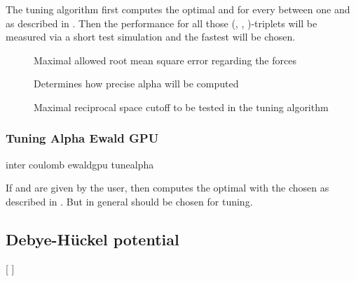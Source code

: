 The tuning algorithm first computes the optimal  and  for every  between one and  as described in \cite{kolafa92}. Then the performance for all those (, , )-triplets will be measured via a short test simulation and the fastest will be chosen. 

\begin{description}
\item[] Maximal allowed root mean square error regarding the forces
\item[] Determines how precise alpha will be computed
\item[] Maximal reciprocal space cutoff  to be tested in the tuning algorithm
\end{description}

\subsubsection{Tuning Alpha Ewald GPU}
\label{ssec:tunealphaewaldgpu}
\begin{essyntax}
  inter coulomb  ewaldgpu tunealpha
    
  \begin{features}
  \end{features}
\end{essyntax}

If  and  are given by the user, then  computes the optimal  with the chosen  as described in \cite{kolafa92}. But in general  should be chosen for tuning. 


\subsection{Debye-H\"uckel potential}

\begin{pysyntax}
  \begin{features}
  \end{features}
  [
    ]
    \begin{features}
    \end{features}
\end{pysyntax}

